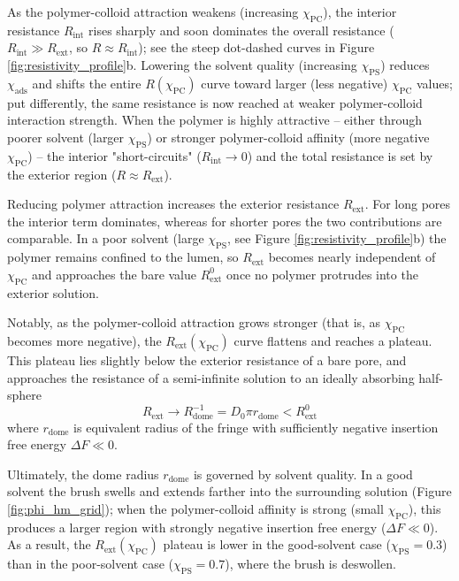 \documentclass[12pt, a4paper]{article}
\begin{document}
As the polymer-colloid attraction weakens (increasing $\chi_{\text{PC}}$), the interior resistance $R_{\text{int}}$ rises sharply and soon dominates the overall resistance ($R_{\text{int}}\gg R_{\text{ext}}$, so $R \approx R_{\text{int}}$); see the steep dot-dashed curves in Figure \ref{fig:resistivity_profile}b.
Lowering the solvent quality (increasing $\chi_{\text{PS}}$) reduces $\chi_{\text{ads}}$ and shifts the entire $R(\chi_{\text{PC}})$ curve toward larger (less negative) $\chi_{\text{PC}}$ values; put differently, the same resistance is now reached at weaker polymer-colloid interaction strength.
When the polymer is highly attractive -- either through poorer solvent (larger $\chi_{\text{PS}}$) or stronger polymer-colloid affinity (more negative $\chi_{\text{PC}}$) -- the interior "short-circuits" ($R_{\text{int}}\to 0$) and the total resistance is set by the exterior region ($R \approx R_{\text{ext}}$).

Reducing polymer attraction increases the exterior resistance $R_{\text{ext}}$.
For long pores the interior term dominates, whereas for shorter pores the two contributions are comparable.
In a poor solvent (large $\chi_{\text{PS}}$, see Figure \ref{fig:resistivity_profile}b) the polymer remains confined to the lumen, so $R_{\text{ext}}$ becomes nearly independent of $\chi_{\text{PC}}$ and approaches the bare value $R_{\text{ext}}^{0}$ once no polymer protrudes into the exterior solution.

Notably, as the polymer-colloid attraction grows stronger (that is, as $\chi_{\text{PC}}$ becomes more negative), the $R_{\text{ext}}(\chi_{\text{PC}})$ curve flattens and reaches a plateau. 
This plateau lies slightly below the exterior resistance of a bare pore, and approaches the resistance of a semi-infinite solution to an ideally absorbing half-sphere
\begin{equation}
    R_{\text{ext}} \to R_{\text{dome}}^{-1} = D_0 \pi r_{\text{dome}} < R_{\text{ext}}^0
    \label{eq:r_dome}
\end{equation}
where $r_{\text{dome}}$ is equivalent radius of the fringe with sufficiently negative insertion free energy $\Delta F \ll 0$.

Ultimately, the dome radius $r_{\text{dome}}$ is governed by solvent quality. In a good solvent the brush swells and extends farther into the surrounding solution (Figure \ref{fig:phi_hm_grid}); when the polymer-colloid affinity is strong (small $\chi_{\text{PC}}$), this produces a larger region with strongly negative insertion free energy ($\Delta F \ll 0$). As a result, the $R_{\text{ext}}(\chi_{\text{PC}})$ plateau is lower in the good-solvent case ($\chi_{\text{PS}} = 0.3$) than in the poor-solvent case ($\chi_{\text{PS}} = 0.7$), where the brush is deswollen.
\end{document}
